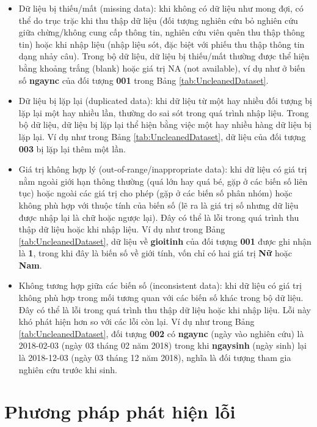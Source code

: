 \documentclass[]{tufte-book}
\begin{document}
\begin{itemize}
\item
  Dữ liệu bị thiếu/mất (missing data): khi không có dữ liệu như mong đợi, có thể do trục trặc khi thu thập dữ liệu (đối tượng nghiên cứu bỏ nghiên cứu giữa chừng/không cung cấp thông tin, nghiên cứu viên quên thu thập thông tin) hoặc khi nhập liệu (nhập liệu sót, đặc biệt với phiếu thu thập thông tin dạng nhảy câu). Trong bộ dữ liệu, dữ liệu bị thiếu/mất thường được thể hiện bằng khoảng trắng (blank) hoặc giá trị NA (not available), ví dụ như ở biến số \textbf{ngaync} của đối tượng \textbf{001} trong Bảng \ref{tab:UncleanedDataset}.
\item
  Dữ liệu bị lặp lại (duplicated data): khi dữ liệu từ một hay nhiều đối tượng bị lặp lại một hay nhiều lần, thường do sai sót trong quá trình nhập liệu. Trong bộ dữ liệu, dữ liệu bị lặp lại thể hiện bằng việc một hay nhiều hàng dữ liệu bị lặp lại. Ví dụ như trong Bảng \ref{tab:UncleanedDataset}, dữ liệu của đối tượng \textbf{003} bị lặp lại thêm một lần.
\item
  Giá trị không hợp lý (out-of-range/inappropriate data): khi dữ liệu có giá trị nằm ngoài giới hạn thông thường (quá lớn hay quá bé, gặp ở các biến số liên tục) hoặc ngoài các giá trị cho phép (gặp ở các biến số phân nhóm) hoặc không phù hợp với thuộc tính của biến số (lẽ ra là giá trị số nhưng dữ liệu được nhập lại là chữ hoặc ngược lại). Đây có thể là lỗi trong quá trình thu thập dữ liệu hoặc khi nhập liệu. Ví dụ như trong Bảng \ref{tab:UncleanedDataset}, dữ liệu về \textbf{gioitinh} của đối tượng \textbf{001} được ghi nhận là \textbf{1}, trong khi đây là biến số về giới tính, vốn chỉ có hai giá trị \textbf{Nữ} hoặc \textbf{Nam}.
\item
  Không tương hợp giữa các biến số (inconsistent data): khi dữ liệu có giá trị không phù hợp trong mối tương quan với các biến số khác trong bộ dữ liệu. Đây có thể là lỗi trong quá trình thu thập dữ liệu hoặc khi nhập liệu. Lỗi này khó phát hiện hơn so với các lỗi còn lại. Ví dụ như trong Bảng \ref{tab:UncleanedDataset}, đối tượng \textbf{002} có \textbf{ngaync} (ngày vào nghiên cứu) là 2018-02-03 (ngày 03 tháng 02 năm 2018) trong khi \textbf{ngaysinh} (ngày sinh) lại là 2018-12-03 (ngày 03 tháng 12 năm 2018), nghĩa là đối tượng tham gia nghiên cứu trước khi sinh.
\end{itemize}

\hypertarget{detectmethod}{%
\section{Phương pháp phát hiện lỗi}\label{detectmethod}}
\end{document}
